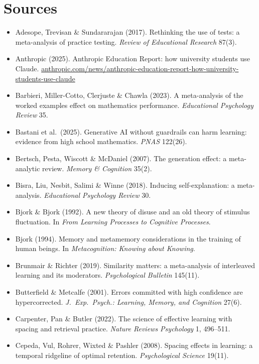 \documentclass{kaelearn}
\newcommand\src[1]{\url{#1}}
\begin{document}
\section{Sources}
{\fontsize{9.5}{11.5}\selectfont{}
\begin{itemize}
\item Adesope, Trevisan \& Sundararajan (2017). Rethinking the use of tests: a meta-analysis of practice testing. \emph{Review of Educational Research} 87(3).
\item Anthropic (2025). Anthropic Education Report: how university students use Claude. \src{anthropic.com/news/anthropic-education-report-how-university-students-use-claude}
\item Barbieri, Miller-Cotto, Clerjuste \& Chawla (2023). A meta-analysis of the worked examples effect on mathematics performance. \emph{Educational Psychology Review} 35.
\item Bastani et al.\ (2025). Generative AI without guardrails can harm learning: evidence from high school mathematics. \emph{PNAS} 122(26).
\item Bertsch, Pesta, Wiscott \& McDaniel (2007). The generation effect: a meta-analytic review. \emph{Memory \& Cognition} 35(2).
\item Bisra, Liu, Nesbit, Salimi \& Winne (2018). Inducing self-explanation: a meta-analysis. \emph{Educational Psychology Review} 30.
\item Bjork \& Bjork (1992). A new theory of disuse and an old theory of stimulus fluctuation. In \emph{From Learning Processes to Cognitive Processes}.
\item Bjork (1994). Memory and metamemory considerations in the training of human beings. In \emph{Metacognition: Knowing about Knowing}.
\item Brunmair \& Richter (2019). Similarity matters: a meta-analysis of interleaved learning and its moderators. \emph{Psychological Bulletin} 145(11).
\item Butterfield \& Metcalfe (2001). Errors committed with high confidence are hypercorrected. \emph{J.\ Exp.\ Psych.: Learning, Memory, and Cognition} 27(6).
\item Carpenter, Pan \& Butler (2022). The science of effective learning with spacing and retrieval practice. \emph{Nature Reviews Psychology} 1, 496--511.
\item Cepeda, Vul, Rohrer, Wixted \& Pashler (2008). Spacing effects in learning: a temporal ridgeline of optimal retention. \emph{Psychological Science} 19(11).

\end{itemize}}
\end{document}
